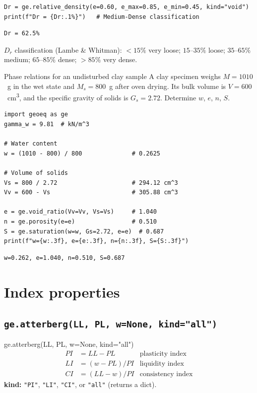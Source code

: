 \documentclass[11pt,a4paper,openany]{book}
\begin{document}
\begin{lstlisting}
Dr = ge.relative_density(e=0.60, e_max=0.85, e_min=0.45, kind="void")
print(f"Dr = {Dr:.1%}")   # Medium-Dense classification
\end{lstlisting}
\begin{lstlisting}[style=output]
Dr = 62.5%
\end{lstlisting}

\begin{tipbox}
$D_r$ classification (Lambe \& Whitman):\quad
$<15\%$ very loose; $15$--$35\%$ loose; $35$--$65\%$ medium;
$65$--$85\%$ dense; $>85\%$ very dense.
\end{tipbox}

\begin{worked}{Phase relations for an undisturbed clay sample}
A clay specimen weighs $M = 1010$~g in the wet state and
$M_s = 800$~g after oven drying. Its bulk volume is
$V = 600$~cm\textsuperscript{3}, and the specific gravity of
solids is $G_s = 2.72$. Determine $w$, $e$, $n$, $S$.
\begin{lstlisting}
import geoeq as ge
gamma_w = 9.81  # kN/m^3

# Water content
w = (1010 - 800) / 800              # 0.2625

# Volume of solids
Vs = 800 / 2.72                     # 294.12 cm^3
Vv = 600 - Vs                       # 305.88 cm^3

e = ge.void_ratio(Vv=Vv, Vs=Vs)     # 1.040
n = ge.porosity(e=e)                # 0.510
S = ge.saturation(w=w, Gs=2.72, e=e)  # 0.687
print(f"w={w:.3f}, e={e:.3f}, n={n:.3f}, S={S:.3f}")
\end{lstlisting}
\begin{lstlisting}[style=output]
w=0.262, e=1.040, n=0.510, S=0.687
\end{lstlisting}
\end{worked}

\section{Index properties}

\subsection{\texttt{ge.atterberg(LL, PL, w=None, kind="all")}}

\begin{funcbox}{ge.atterberg(LL, PL, w=None, kind="all")}
\begin{align*}
PI &= LL - PL                 &\text{plasticity index}\\
LI &= (w - PL) / PI           &\text{liquidity index}\\
CI &= (LL - w) / PI           &\text{consistency index}
\end{align*}
\textbf{kind:} \texttt{"PI"}, \texttt{"LI"}, \texttt{"CI"}, or
\texttt{"all"} (returns a dict).
\end{funcbox}
\end{document}
